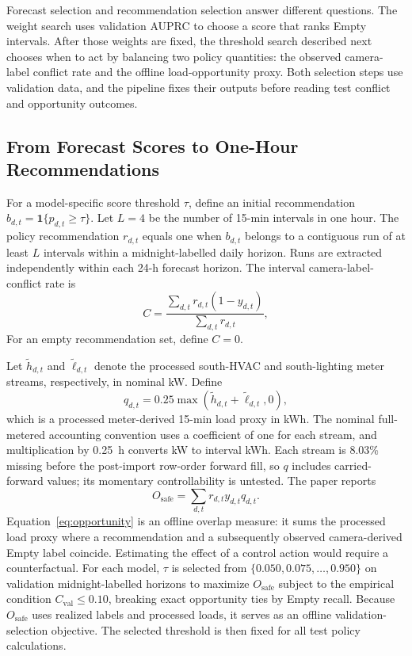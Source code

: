 Forecast selection and recommendation selection answer different questions. The weight search uses validation AUPRC to choose a score that ranks Empty intervals. After those weights are fixed, the threshold search described next chooses when to act by balancing two policy quantities: the observed camera-label conflict rate and the offline load-opportunity proxy. Both selection steps use validation data, and the pipeline fixes their outputs before reading test conflict and opportunity outcomes.



\subsection{From Forecast Scores to One-Hour Recommendations}

For a model-specific score threshold $\tau$, define an initial recommendation $b_{d,t}=\mathbf{1}\{p_{d,t}\geq\tau\}$. Let $L=4$ be the number of 15-min intervals in one hour. The policy recommendation $r_{d,t}$ equals one when $b_{d,t}$ belongs to a contiguous run of at least $L$ intervals within a midnight-labelled daily horizon. Runs are extracted independently within each 24-h forecast horizon. The interval camera-label-conflict rate is
\begin{equation}
C=\frac{\sum_{d,t}r_{d,t}(1-y_{d,t})}{\sum_{d,t}r_{d,t}},
\label{eq:conflict}
\end{equation}
For an empty recommendation set, define $C=0$.

Let $\widetilde{h}_{d,t}$ and $\widetilde{\ell}_{d,t}$ denote the processed south-HVAC and south-lighting meter streams, respectively, in nominal kW. Define
\begin{equation}
q_{d,t}=0.25\max(\widetilde{h}_{d,t}+\widetilde{\ell}_{d,t},0),
\label{eq:load-proxy}
\end{equation}
which is a processed meter-derived 15-min load proxy in kWh. The nominal full-metered accounting convention uses a coefficient of one for each stream, and multiplication by 0.25~h converts kW to interval kWh. Each stream is 8.03\% missing before the post-import row-order forward fill, so $q$ includes carried-forward values; its momentary controllability is untested. The paper reports
\begin{equation}
O_{\mathrm{safe}}=\sum_{d,t}r_{d,t}y_{d,t}q_{d,t}.
\label{eq:opportunity}
\end{equation}
Equation~\eqref{eq:opportunity} is an offline overlap measure: it sums the processed load proxy where a recommendation and a subsequently observed camera-derived Empty label coincide. Estimating the effect of a control action would require a counterfactual. For each model, $\tau$ is selected from $\{0.050,0.075,\ldots,0.950\}$ on validation midnight-labelled horizons to maximize $O_{\mathrm{safe}}$ subject to the empirical condition $C_{\mathrm{val}}\leq0.10$, breaking exact opportunity ties by Empty recall. Because $O_{\mathrm{safe}}$ uses realized labels and processed loads, it serves as an offline validation-selection objective. The selected threshold is then fixed for all test policy calculations.
